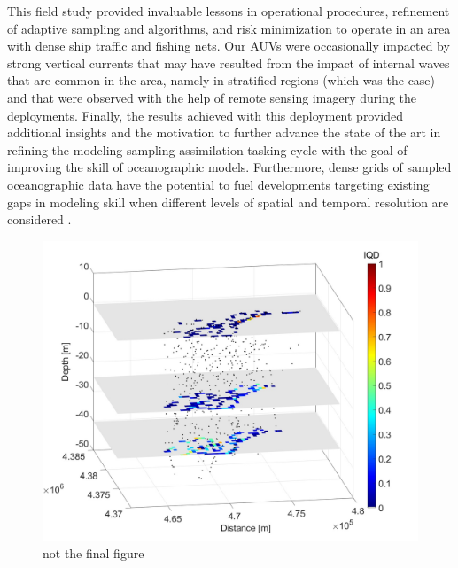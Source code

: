 This field study provided invaluable lessons in operational procedures,
refinement of adaptive sampling and algorithms, and risk minimization to
operate in an area with dense ship traffic and fishing nets. Our AUVs
were occasionally impacted by strong vertical currents that may have
resulted from the impact of internal waves that are common in the area,
namely in stratified regions (which was the case) and that were observed
with the help of remote sensing imagery during the deployments. Finally,
the results achieved with this deployment provided additional insights
and the motivation to further advance the state of the art in refining
the modeling-sampling-assimilation-tasking cycle with the goal of
improving the skill of oceanographic models. Furthermore, dense grids of
sampled oceanographic data have the potential to fuel developments
targeting existing gaps in modeling skill when different levels of
spatial and temporal resolution are considered \cite{Balaji_2022}.


\begin{figure}[!]
  \centering
  \includegraphics[scale=0.3]{fig/iqd_3D.jpeg}
  \caption{not the final figure}
  \label{fig:iqd_3D}
\end{figure}


